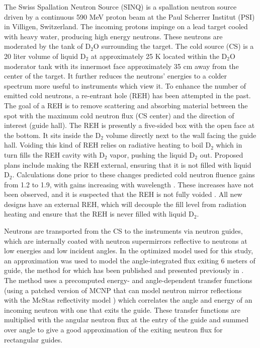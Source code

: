 \documentclass[a4paper]{jpconf}
\begin{document}
The Swiss Spallation Neutron Source (SINQ) is a spallation neutron source driven by a continuous 590 MeV proton beam at the Paul Scherrer Institut (PSI) in Villigen, Switzerland.  The incoming protons impinge on a lead target cooled with heavy water, producing high energy neutrons.  These neutrons are moderated by the tank of D$_2$O surrounding the target.  The cold source (CS) is a 20 liter volume of liquid D$_2$ at approximately 25 K located within the D$_2$O moderator tank with its innermost face approximately 35 cm away from the center of the target.  It further reduces the neutrons' energies to a colder spectrum more useful to instruments which view it.  To enhance the number of emitted cold neutrons, a re-entrant hole (REH) has been attempted in the past.  The goal of a REH is to remove scattering and absorbing material between the spot with the maximum cold neutron flux (CS center) and the direction of interest (guide hall).  The REH is presently a five-sided box with the open face at the bottom.  It sits inside the D$_2$ volume directly next to the wall facing the guide hall.  Voiding this kind of REH relies on radiative heating to boil D$_2$ which in turn fills the REH cavity with D$_2$ vapor, pushing the liquid D$_2$ out.  Proposed plans include making the REH external, ensuring that it is not filled with liquid D$_2$.  Calculations done prior to these changes predicted cold neutron fluence gains from 1.2 to 1.9, with gains increasing with wavelength \cite{atch_icans}. These increases have not been observed, and it is suspected that the REH is not fully voided \cite{voided}.  All new designs have an external REH, which will decouple the fill level from radiation heating and ensure that the REH is never filled with liquid D$_2$.  

Neutrons are transported from the CS to the instruments via neutron guides, which are internally coated with neutron supermirrors reflective to neutrons at low energies and low incident angles.  In the optimized model used for this study, an approximation was used to model the angle-integrated flux exiting 6 meters of guide, the method for which has been published and presented previously in \cite{ecns}.  The method uses a precomputed energy- and angle-dependent transfer functions (using a patched version of MCNP that can model neutron mirror reflections with the McStas reflectivity model \cite{mcnpx-ref}) which correlates the angle and energy of an incoming neutron with one that exits the guide.  These transfer functions are multiplied with the angular neutron flux at the entry of the guide and summed over angle to give a good approximation of the exiting neutron flux for rectangular guides.    
\end{document}
